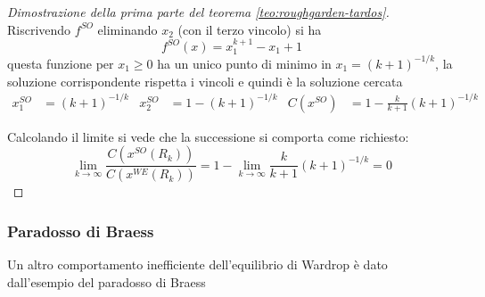 \documentclass[a4paper]{article}
\theoremstyle{plain}
\theoremstyle{definition}
\theoremstyle{remark}
\newcommand{\pa}[1]{\left(#1\right)}
\begin{document}
\begin{proof}[Dimostrazione della prima parte del teorema \ref{teo:roughgarden-tardos}]
  Riscrivendo $f^{SO}$ eliminando $x_2$ (con il terzo vincolo) si ha
  \[ f^{SO}(x) = x_1^{k+1} - x_1 + 1 \]
  questa funzione per $x_1\ge 0$ ha un unico punto di minimo in $x_1 =
  \pa{k+1}^{-1/k}$, la soluzione corrispondente rispetta i vincoli e
  quindi è la soluzione cercata
  \begin{align*}
    x^{SO}_1 &= \pa{k+1}^{-1/k} & x^{SO}_2 &= 1- \pa{k+1}^{-1/k} &
    C\pa{x^{SO}} &= 1 - \frac{k}{k+1}\pa{k+1}^{-1/k} 
  \end{align*}
  
  Calcolando il limite si vede che la successione si comporta come
  richiesto:
  \[ \lim _{k\to \infty} \frac{C\pa{ x^{SO}\pa{R_k}}}{C\pa{
        x^{WE}\pa{R_k}}} = 1 - \lim _{k\to \infty}
    \frac{k}{k+1}\pa{k+1}^{-1/k} = 0 \]
\end{proof}

\subsubsection{Paradosso di Braess}
\label{sec:paradosso-braess}

Un altro comportamento inefficiente dell'equilibrio di Wardrop è dato
dall'esempio del paradosso di Braess
\end{document}

